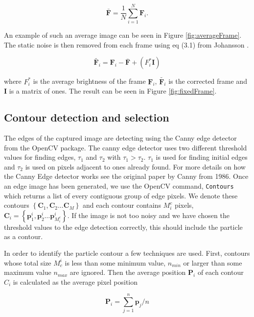 \begin{equation}\label{eq:averageFrame}
\bar{\mathbf{F}} = \frac{1}{N}\sum\limits_{i=1}^{N} \mathbf{F}_i.
\end{equation}

An example of such an average image can be seen in Figure \ref{fig:averageFrame}. The static noise is then removed from each frame using eq (3.1) from Johansson \cite{AntonThesis}.

\begin{equation}
\widetilde{\mathbf{F}_{i}} = \mathbf{F}_i - \bar{\mathbf{F}} + (F_i^*\mathbf{I})
\end{equation}

\noindent where $F_i^*$ is the average brightness of the frame $\mathbf{F}_i$, $\widetilde{\mathbf{F}_{i}}$ is the corrected frame and $\mathbf{I}$ is a matrix of ones. The result can be seen in Figure \ref{fig:fixedFrame}. 




\subsection{Contour detection and selection}
The edges of the captured image are detecting using the Canny edge detector from the OpenCV package. The canny edge detector uses two different threshold values for finding edges, $\tau_1$ and $\tau_2$ with $\tau_1 > \tau_2$. $\tau_1$ is used for finding initial edges and $\tau_2$ is used on pixels adjacent to ones already found. For more details on how the Canny Edge detector works see the original paper by Canny from 1986\cite{Canny}. Once an edge image has been generated, we use the OpenCV command, \texttt{Contours} which returns a list of every contiguous group of edge pixels.  We denote these contours $\left\{\mathbf{C}_1, \mathbf{C}_2 \ldots \mathbf{C}_M \right\}$ and each contour contains $M^c_i$ pixels, $\mathbf{C}_i = \left\{\mathbf{p}^i_1, \mathbf{p}^i_2 \ldots \mathbf{p}^i_{M^c_i}\right\} $. If the image is not too noisy and we have chosen the threshold values to the edge detection correctly, this should include the particle as a contour. 

In order to identify the particle contour  a few techniques are used. First, contours whose total size $ M_c^i$ is less than some minimum value, $ n_{min}$ or larger than some maximum value $n_{max}$ are ignored. Then the average position $\mathbf{P}_i$ of each contour $C_i$ is calculated as the average pixel position

\[
\mathbf{P}_i = \sum_{j=1}^n \mathbf{p}_j/n
\]

